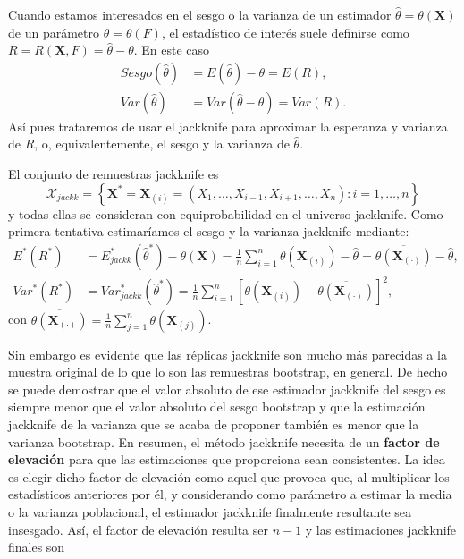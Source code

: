 \documentclass[
]{book}
\theoremstyle{definition}
\theoremstyle{definition}
\theoremstyle{definition}
\theoremstyle{remark}
\begin{document}
Cuando estamos interesados en el sesgo o la varianza de un estimador
\(\hat{\theta}=\theta \left( \mathbf{X} \right)\) de un parámetro
\(\theta =\theta \left( F \right)\), el estadístico de interés suele
definirse como
\(R=R\left( \mathbf{X},F \right) =\hat{\theta}-\theta\).
En este caso
\[\begin{aligned}
Sesgo\left( \hat{\theta} \right) &= E\left( \hat{\theta} \right) -\theta
=E\left( R \right), \\
Var\left( \hat{\theta} \right) &= Var\left( \hat{\theta}-\theta \right)
=Var\left( R \right).
\end{aligned}\]
Así pues trataremos de usar el
jackknife para aproximar la esperanza y varianza de \(R\), o,
equivalentemente, el sesgo y la varianza de \(\hat{\theta}\).

El conjunto de remuestras jackknife es
\[\mathcal{X}_{jackk}=\left\{ \mathbf{X}^{\ast}=
\mathbf{X}_{(i)}=\left( X_1,\ldots ,X_{i-1},X_{i+1},\ldots
,X_n \right) : i=1,\ldots ,n\right\}\]
y todas ellas se consideran con
equiprobabilidad en el universo jackknife. Como primera tentativa
estimaríamos el sesgo y la varianza jackknife mediante:
\[\begin{aligned}
E^{\ast}\left( R^{\ast} \right) &= E_{jackk}^{\ast}\left( \hat{\theta}
^{\ast} \right) -\theta \left( \mathbf{X} \right) =\frac{1}{n}
\sum_{i=1}^{n}\theta \left( \mathbf{X}_{(i)} \right) -
\hat{\theta}=\overline{\theta \left( \mathbf{X}_{(\cdot)} \right)}-\hat{\theta}, \\
Var^{\ast}\left( R^{\ast} \right) &= Var_{jackk}^{\ast}\left( \hat{\theta}
^{\ast} \right) =\frac{1}{n}\sum_{i=1}^{n}\left[ \theta \left( 
\mathbf{X}_{(i)} \right) -\overline{\theta \left( 
\mathbf{X}_{(\cdot)} \right)}\right]^2,
\end{aligned}\]
con \(\overline{\theta \left( \mathbf{X}_{(\cdot)} \right)} = \frac{1}{n}\sum_{j=1}^{n}\theta \left( \mathbf{X}_{(j)} \right)\).

Sin embargo es evidente que las réplicas jackknife son mucho más
parecidas a la muestra original de lo que lo son las remuestras
bootstrap, en general. De hecho se puede demostrar que el valor absoluto
de ese estimador jackknife del sesgo es siempre menor que el valor
absoluto del sesgo bootstrap y que la estimación jackknife de la
varianza que se acaba de proponer también es menor que la varianza
bootstrap. En resumen, el método jackknife necesita de un \textbf{factor de
elevación} para que las estimaciones que proporciona sean consistentes.
La idea es elegir dicho factor de elevación como aquel que provoca que,
al multiplicar los estadísticos anteriores por él, y considerando como
parámetro a estimar la media o la varianza poblacional, el estimador
jackknife finalmente resultante sea insesgado. Así, el factor de
elevación resulta ser \(n-1\) y las estimaciones jackknife finales son
\end{document}
